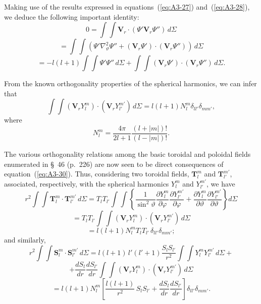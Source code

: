 Making use of the results expressed in equations~(\ref{eq:A3-27}) and~(\ref{eq:A3-28}), we deduce the following important identity:
\begin{equation}
\label{eq:A3-29}
0 = \int\!\!\int \mathbf{V}_r \cdot (\Psi'\mathbf{V}_r\Psi'') \, d\Sigma
\end{equation}
\[
= \int\!\!\int (\Psi'\nabla^2_\vartheta\Psi'' + (\mathbf{V}_r\Psi') \cdot (\mathbf{V}_r\Psi'')) \, d\Sigma
\]
\[
= -l(l+1) \int\!\!\int \Psi' \Psi'' \, d\Sigma + \int\!\!\int (\mathbf{V}_r\Psi') \cdot (\mathbf{V}_r\Psi'') \, d\Sigma.
\]

From the known orthogonality properties of the spherical harmonics, we can infer that
\begin{equation}
\label{eq:A3-30}
\int\!\!\int (\mathbf{V}_r Y_l^m) \cdot (\mathbf{V}_r Y_{l'}^{m'}) \, d\Sigma = l(l+1) N_l^m \delta_{ll'} \delta_{mm'},
\end{equation}
where
\begin{equation}
\label{eq:A3-31}
N_l^m = \frac{4\pi}{2l+1}\frac{(l+|m|)!}{(l-|m|)!}.
\end{equation}

The various orthogonality relations among the basic toroidal and poloidal fields enumerated in \S~46 (p.~226) are now seen to be direct consequences of equation~(\ref{eq:A3-30}). Thus, considering two toroidal fields, $\mathbf{T}_l^m$ and $\mathbf{T}_{l'}^{m'}$, associated, respectively, with the spherical harmonics $Y_l^m$ and $Y_{l'}^{m'}$, we have
\begin{equation}
\label{eq:A3-32}
r^2 \int\!\!\int \mathbf{T}_l^m \cdot \mathbf{T}_{l'}^{m'} \, d\Sigma = T_l T_{l'} \int\!\!\int \left\{ \frac{1}{\sin^2\vartheta}\frac{\partial Y_l^m}{\partial\varphi}\frac{\partial Y_{l'}^{m'}}{\partial\varphi} + \frac{\partial Y_l^m}{\partial\vartheta}\frac{\partial Y_{l'}^{m'}}{\partial\vartheta} \right\} d\Sigma
\end{equation}
\[
= T_l T_{l'} \int\!\!\int (\mathbf{V}_r Y_l^m) \cdot (\mathbf{V}_r Y_{l'}^{m'}) \, d\Sigma
\]
\[
= l(l+1) N_l^m T_l T_{l'} \, \delta_{ll'} \delta_{mm'};
\]
and similarly,
\begin{equation}
\label{eq:A3-33}
r^2 \int\!\!\int \mathbf{S}_l^m \cdot \mathbf{S}_{l'}^{m'} \, d\Sigma = l(l+1)\,l'(l'+1)\frac{S_l S_{l'}}{r^2} \int\!\!\int Y_l^m Y_{l'}^{m'} \, d\Sigma +
\end{equation}
\[
+ \frac{dS_l}{dr}\frac{dS_{l'}}{dr}\int\!\!\int (\mathbf{V}_r Y_l^m) \cdot (\mathbf{V}_r Y_{l'}^{m'}) \, d\Sigma
\]
\[
= l(l+1) N_l^m \left[ \frac{l(l+1)}{r^2}\,S_l S_{l'} + \frac{dS_l}{dr}\frac{dS_{l'}}{dr} \right] \delta_{ll'}\delta_{mm'}.
\]

